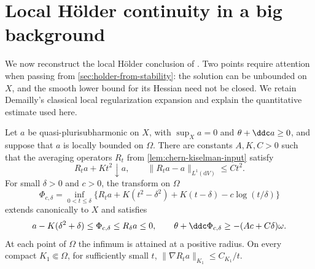 \section{Local H\"older continuity in a big background}
\label{sec:big-minimal-holder}

We now reconstruct the local H\"older conclusion of
\cite[Theorem~A]{Dang26}. Two points require attention when passing from
\cref{sec:holder-from-stability}: the solution can be unbounded on $X$,
and the smooth lower bound for its Hessian need not be closed. We retain
Demailly's classical local regularization expansion and explain the
quantitative estimate used here.

\begin{lemma}\label{lem:smooth-background-regularization-rate}
Let $a$ be quasi-plurisubharmonic on $X$, with $\sup_Xa=0$ and
$\theta+\ddc a\geq0$, and suppose that $a$ is locally bounded on $\Omega$.
There are constants $A,K,C>0$ such that the averaging operators $R_t$
from \cref{lem:chern-kiselman-input} satisfy
\[
 R_ta+Kt^2\downarrow a,\qquad
 \|R_ta-a\|_{L^1(\mathrm{d}V)}\leq Ct^2.
\]
For small $\delta>0$ and $c>0$, the transform on $\Omega$
\[
 \Phi_{c,\delta}
 =\inf_{0<t\leq\delta}
 \{R_ta+K(t^2-\delta^2)+K(t-\delta)-c\log(t/\delta)\}
\]
extends canonically to $X$ and satisfies
\begin{equation}\label{eq:smooth-background-transform-rate}
 a-K(\delta^2+\delta)\leq\Phi_{c,\delta}\leq R_\delta a\leq0,
 \qquad \theta+\ddc\Phi_{c,\delta}\geq-(Ac+C\delta)\omega.
\end{equation}
At each point of $\Omega$ the infimum is attained at a positive radius.
On every compact $K_1\Subset\Omega$, for sufficiently small $t$,
$\|\nabla R_ta\|_{K_1}\leq C_{K_1}/t$.
\end{lemma}

